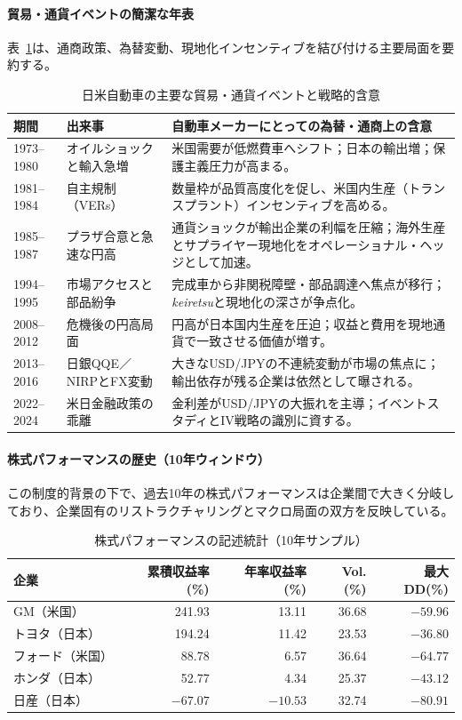 \documentclass[12pt,a4paper]{article}
\begin{document}
\paragraph{貿易・通貨イベントの簡潔な年表}

表~\ref{tab:timeline}は、通商政策、為替変動、現地化インセンティブを結び付ける主要局面を要約する。

\begin{table}[H]
\centering
\caption{日米自動車の主要な貿易・通貨イベントと戦略的含意}
\label{tab:timeline}
\begin{tabular}{p{1.7cm} p{4.0cm} p{7.0cm}}
\toprule
期間 & 出来事 & 自動車メーカーにとっての為替・通商上の含意 \\
\midrule
1973--1980 & オイルショックと輸入急増 & 米国需要が低燃費車へシフト；日本の輸出増；保護主義圧力が高まる。 \\
1981--1984 & 自主規制（VERs） & 数量枠が品質高度化を促し、米国内生産（トランスプラント）インセンティブを高める。 \\
1985--1987 & プラザ合意と急速な円高 & 通貨ショックが輸出企業の利幅を圧縮；海外生産とサプライヤー現地化をオペレーショナル・ヘッジとして加速。 \\
1994--1995 & 市場アクセスと部品紛争 & 完成車から非関税障壁・部品調達へ焦点が移行；\textit{keiretsu}と現地化の深さが争点化。 \\
2008--2012 & 危機後の円高局面 & 円高が日本国内生産を圧迫；収益と費用を現地通貨で一致させる価値が増す。 \\
2013--2016 & 日銀QQE／NIRPとFX変動 & 大きなUSD/JPYの不連続変動が市場の焦点に；輸出依存が残る企業は依然として曝される。 \\
2022--2024 & 米日金融政策の乖離 & 金利差がUSD/JPYの大振れを主導；イベントスタディとIV戦略の識別に資する。 \\
\bottomrule
\end{tabular}
\end{table}

\paragraph{株式パフォーマンスの歴史（10年ウィンドウ）}

この制度的背景の下で、過去10年の株式パフォーマンスは企業間で大きく分岐しており、企業固有のリストラクチャリングとマクロ局面の双方を反映している。

\begin{table}[H]
\centering
\caption{株式パフォーマンスの記述統計（10年サンプル）}
\small
\begin{tabular}{lrrrr}
\toprule
企業 & 累積収益率(\%) & 年率収益率(\%) & Vol.(\%) & 最大DD(\%) \\
\midrule
GM（米国） & 241.93 & 13.11 & 36.68 & $-59.96$ \\
トヨタ（日本） & 194.24 & 11.42 & 23.53 & $-36.80$ \\
フォード（米国） & 88.78 & 6.57 & 36.64 & $-64.77$ \\
ホンダ（日本） & 52.77 & 4.34 & 25.37 & $-43.12$ \\
日産（日本） & $-67.07$ & $-10.53$ & 32.74 & $-80.91$ \\
\bottomrule
\end{tabular}
\end{table}
\end{document}
